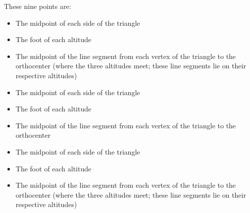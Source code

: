 \documentclass{beamer}
\begin{document}
\begin{frame}

 These nine points are:

    \begin{itemize}
        \item The midpoint of each side of the triangle
        \pause
        \item The foot of each altitude
        \pause
        \item The midpoint of the line segment from each vertex of the triangle to the orthocenter
        (where the three altitudes meet; these line segments lie on their respective altitudes)     
    \end{itemize}


\end{frame}


\begin{frame}
    \begin{itemize}
        \item The midpoint of each side of the triangle \cite{2}
       
        \item The foot of each altitude \cite{3}

        \item The midpoint of the line segment from each vertex of the triangle to the orthocenter
    \end{itemize}


    
    
\end{frame}


\begin{frame}
    \begin{itemize}
        \item The midpoint of each side of the triangle

        \item The foot of each altitude

        \item The midpoint of the line segment from each vertex of the triangle to the orthocenter
        (where the three altitudes meet; these line segments lie on their respective altitudes) 

   
    
    \end{itemize}

 

\end{frame}
\end{document}
